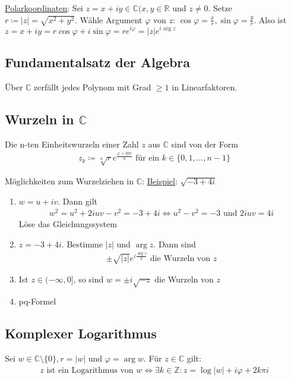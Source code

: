 \documentclass{article}
\begin{document}
\underline{Polarkoordinaten}: Sei $z=x+iy \in \mathbb{C} (x,y \in \mathbb{R}$ und $z \neq 0$. Setze $r \coloneqq |z| = \sqrt{x^2 + y^2}$.
Wähle Argument $\varphi$ von $z$: $\cos \varphi = \frac{x}{r}, \sin \varphi = \frac{y}{r}$. Also ist $z=x+iy = r\cos \varphi + i\sin \varphi = re^{i\varphi} = |z|e^{i \arg z}$

\subsection{Fundamentalsatz der Algebra}
Über $\mathbb{C}$ zerfällt jedes Polynom mit Grad $\geq 1$ in Linearfaktoren.

\subsection{Wurzeln in $\mathbb{C}$}
Die n-ten Einheitswurzeln einer Zahl $z$ aus $\mathbb{C}$ sind von der Form 
\begin{align*}
    z_k \coloneqq \sqrt[n]{r} e^{\frac{\varphi + 2k\pi}{n}} \text{ für ein } k \in \{0,1,\ldots,n-1\}
\end{align*}

\newpage

Möglichkeiten zum Wurzelziehen in $\mathbb{C}$:
\underline{Beispiel}: $\sqrt{-3+4i}$
\begin{enumerate}
    \item $w=u+iv$. Dann gilt
    \begin{align*}
        w^2 = u^2 + 2iuv - v^2 = -3+4i \Leftrightarrow u^2 - v^2 = -3 \text{ und } 2iuv=4i
    \end{align*}
    Löse das Gleichungssystem
    \item $z=-3+4i$. Bestimme $|z|$ und $\arg z$. Dann sind 
    \begin{align*}
        \pm \sqrt{|z|} e^{i \frac{\arg z}{2}} \text{ die Wurzeln von } z
    \end{align*}
    \item Ist $z \in (-\infty,0]$, so sind $w=\pm i \sqrt{-z}$ die Wurzeln von $z$
    \item pq-Formel
\end{enumerate}

\subsection{Komplexer Logarithmus}
Sei $w\in \mathbb{C} \setminus \{0\}, r=|w|$ und $\varphi = \arg w$. Für $z \in \mathbb{C}$ gilt: 
\begin{align*}
    z \text{ ist ein Logarithmus von } w \Leftrightarrow \exists k \in \mathbb{Z}: z = \log |w| + i\varphi + 2k\pi i
\end{align*}
\end{document}
